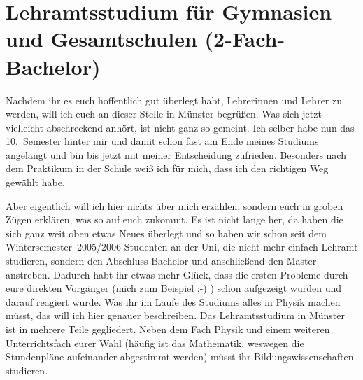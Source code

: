 
\section[Lehramtsstudium für Gymnasien \& Gesamtschulen (2-Fach-Bachelor)]{Lehramtsstudium für Gymnasien und Gesamtschulen (2-Fach-Bachelor)}
\begin{multicols*}{2}
Nachdem ihr es euch hoffentlich gut überlegt habt, Lehrerinnen und Lehrer zu werden, will ich euch an dieser Stelle in Münster begrüßen. Was sich jetzt vielleicht abschreckend anhört, ist nicht ganz so gemeint. Ich selber habe nun das 10.\ Semester hinter mir und damit schon fast am Ende meines Studiums angelangt und bin bis jetzt mit meiner Entscheidung zufrieden. Besonders nach dem Praktikum in der Schule weiß ich für mich, dass ich den richtigen Weg gewählt habe.

Aber eigentlich will ich hier nichts über mich erzählen, sondern euch in groben Zügen erklären, was so auf euch zukommt. Es ist nicht lange her, da haben die sich ganz weit oben etwas Neues überlegt und so haben wir schon seit dem Wintersemester~2005/2006 Studenten an der Uni, die nicht mehr einfach Lehramt studieren, sondern den Abschluss Bachelor und anschließend den Master anstreben. Dadurch habt ihr etwas mehr Glück, dass die ersten Probleme durch eure direkten Vorgänger (mich zum Beispiel ;-) ) schon aufgezeigt wurden und darauf reagiert wurde. Was ihr im Laufe des Studiums alles in Physik machen müsst, das will ich hier genauer beschreiben. Das Lehramtsstudium in Münster ist in mehrere Teile gegliedert. Neben dem Fach Physik und einem weiteren Unterrichtsfach eurer Wahl (häufig ist das Mathematik, weswegen die Stundenpläne aufeinander abgestimmt werden) müsst ihr Bildungswissenschaften studieren.

\begin{center}
\end{center}


\end{multicols*}
